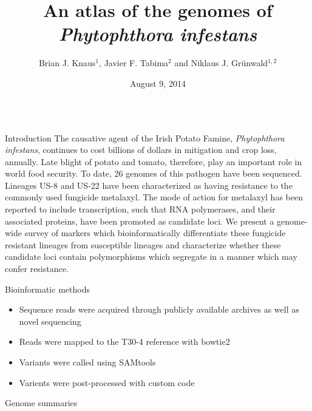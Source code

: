 \documentclass[final,t]{beamer}
\title{\huge An atlas of the genomes of\\ \emph{Phytophthora infestans}}
\author[Knaus et al.]{Brian J. Knaus$^{1}$, Javier F. Tabima$^{2}$ and Niklaus J. Gr\"{u}nwald$^{1, 2}$}
\institute[USDA-ARS, OSU, UCR]{$^{1}$Horticultural Crops Research Unit, USDA Agricultural Research Service\\ $^{2}$Department of Botany and Plant Pathology, Oregon State University}
\date[August 9, 2014]{August 9, 2014}
\begin{document}
\begin{frame}{} 
  \begin{columns}[t]
    \begin{column}{.28\linewidth}


      \begin{block}{Introduction}
The causative agent of the Irish Potato Famine, \emph{Phytophthora infestans}, continues to cost billions of dollars in mitigation and crop loss, annually.  Late blight of potato and tomato, therefore, play an important role in world food security.  To date, 26 genomes of this pathogen have been sequenced.  Lineages US-8 and US-22 have been characterized as having resistance to the commonly used fungicide metalaxyl.  The mode of action for metalaxyl has been reported to include transcription, such that RNA polymerases, and their associated proteins, have been promoted as candidate loci.  We present a genome-wide survey of markers which bioinformatically differentiate these fungicide resistant lineages from susceptible lineages and characterize whether these candidate loci contain polymorphisms which segregate in a manner which may confer resistance.
      \end{block}


      
  \begin{block}{Bioinformatic methods}
    \begin{itemize}
      \item Sequence reads were acquired through publicly available archives as well as novel sequencing
      \item Reads were mapped to the T30-4 reference with bowtie2
      \item Variants were called using SAMtools
      \item Varients were post-processed with custom code
    \end{itemize}
  \end{block}

      \begin{block}{Genome summaries}


\end{block}
\end{column}
\end{columns}
\end{frame}
\end{document}

